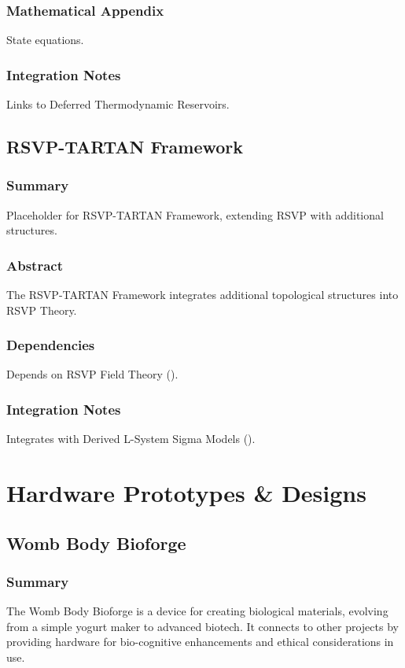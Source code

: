 \documentclass[11pt,oneside]{memoir}
\theoremstyle{plain}
\begin{document}
\section{Mathematical Appendix}
State equations.

\section{Integration Notes}
Links to Deferred Thermodynamic Reservoirs.

\chapter{RSVP-TARTAN Framework}
\label{sec:rsvp_tartan}
\section{Summary}
Placeholder for RSVP-TARTAN Framework, extending RSVP with additional structures.

\section{Abstract}
The RSVP-TARTAN Framework integrates additional topological structures into RSVP Theory.

\section{Dependencies}
Depends on RSVP Field Theory ().

\section{Integration Notes}
Integrates with Derived L-System Sigma Models ().

\part{Hardware Prototypes \& Designs}

\chapter{Womb Body Bioforge}
\label{sec:womb_bioforge}

\section{Summary}
The Womb Body Bioforge is a device for creating biological materials, evolving from a simple yogurt maker to advanced biotech. It connects to other projects by providing hardware for bio-cognitive enhancements and ethical considerations in use.
\end{document}
